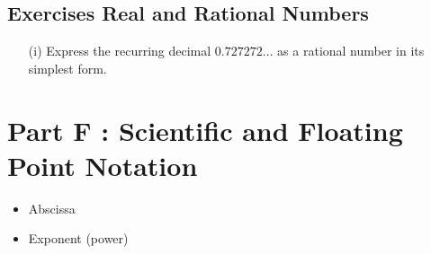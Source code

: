 \documentclass[]{report}
\begin{document}








\subsection*{Exercises Real and Rational Numbers}
\begin{itemize}
\item[(i)] Express the recurring decimal $0.727272\ldots$ as a rational number in its simplest form.
\end{itemize}
\section*{Part F :  Scientific and Floating Point Notation}

\begin{itemize}
\item Abscissa 
\item Exponent (power)
\end{itemize}
\end{document}

